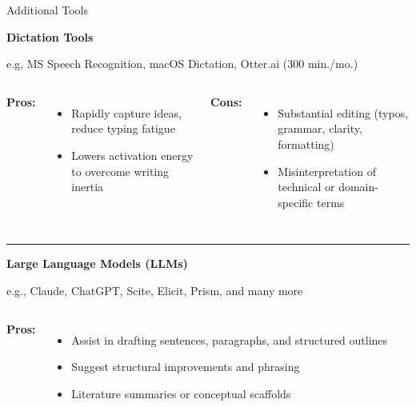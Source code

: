 \documentclass{beamer}
\begin{document}
\begin{frame}{Additional Tools}

\fontsize{10pt}{10pt}\selectfont

\textbf{Dictation Tools}

e.g, MS Speech Recognition,  macOS Dictation, Otter.ai {\tiny (300 min./mo.)}

\begin{columns}[T, totalwidth=\textwidth]
    {\fontsize{8pt}{9pt}\selectfont
    \textbf{Pros:}
    \begin{itemize}
        \item Rapidly capture ideas, reduce typing fatigue
        \item Lowers activation energy to overcome writing inertia
    \end{itemize}
    }

    {\fontsize{8pt}{9pt}\selectfont
    \textbf{Cons:}
    \begin{itemize}
        \item Substantial editing (typos, grammar, clarity, formatting)
        \item Misinterpretation of technical or domain-specific terms
    \end{itemize}
    }
\end{columns}

\vspace{0.5em}
\noindent\rule{\textwidth}{1pt}

\textbf{Large Language Models (LLMs)}

    e.g., Claude, ChatGPT, Scite, Elicit, Prism, and many more

\begin{columns}[T, totalwidth=\textwidth]
    {\fontsize{8pt}{9pt}\selectfont
    \textbf{Pros:}
    \begin{itemize}
        \item Assist in drafting sentences, paragraphs, and structured outlines
        \item Suggest structural improvements and phrasing
        \item Literature summaries or conceptual scaffolds
    \end{itemize}
    }


\end{columns}
\end{frame}
\end{document}
